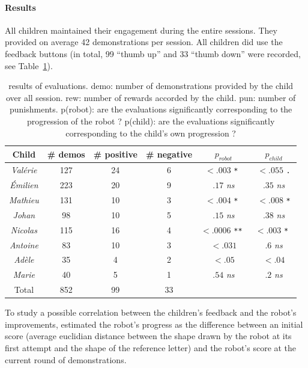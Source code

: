 \documentclass{article}
\begin{document}
\paragraph{Results}

All children maintained their engagement during the entire sessions. They
provided on average 42 demonstrations per session. All children did use the
feedback buttons (in total, 99 ``thumb up'' and 33 ``thumb down'' were recorded,
see Table~\ref{table:scores}). 

\begin{table}
    \centering
    \begin{tabular}{cccccc}
        \toprule
        Child          & \# demos & \# positive & \# negative & $p_{robot}$ & $p_{child}$\\ \midrule
        \emph{Valérie} & 127 & 24 & 6 & $< .003$ \tt ** & $< .055$ \tt .\\ 
        \emph{Émilien} & 223 & 20 & 9 & $.17$ \it ns & $.35$ \it ns \\
        \emph{Mathieu} & 131 & 10 & 3 & $< .004$ \tt ** & $< .008$ \tt **\\
        \emph{Johan}   & 98 & 10 & 5 &  $.15$ \it ns & $.38$ \it ns  \\
        \emph{Nicolas} & 115 & 16 & 4 & $< .0006$ \tt *** & $< .003$ \tt ** \\
        \emph{Antoine} & 83 & 10 & 3 & $< .031$ \tt * & $.6$ \it ns \\
        \emph{Adèle}   & 35 & 4 & 2 & $< .05$ \tt * & $< .04$ \tt * \\
        \emph{Marie}   & 40 & 5 & 1 &  $.54$ \it ns & $.2$ \it ns \\ \midrule
        Total          & 852 & 99 & 33 &   & \\ \bottomrule
    \end{tabular}
    \caption{\small results of evaluations. demo: number of demonstrations provided by
        the child over all session. rew: number of rewards accorded by
        the child. pun: number of punishments. p(robot): are the evaluations
        significantly corresponding to the progression of the robot ? p(child): are the
        evaluations significantly corresponding to the child's own
progression ?}
    \label{table:scores}
\end{table}

To study a possible correlation between the children's feedback and the robot's
improvements, estimated the robot's progress as the difference between an
initial score (average euclidian distance between the shape drawn by the robot
at its first attempt and the shape of the reference letter) and the robot's
score at the current round of demonstrations.
\end{document}
